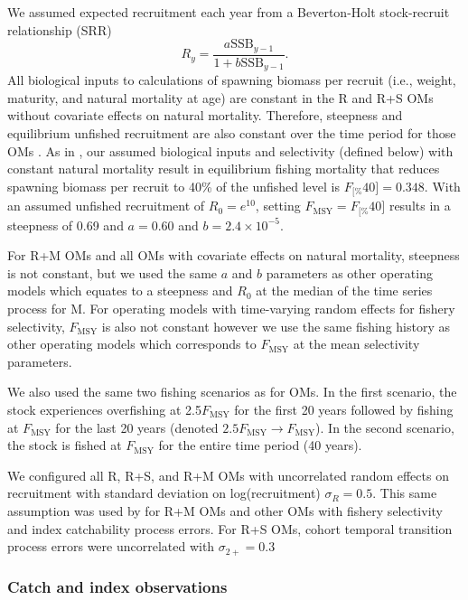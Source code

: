 \documentclass[
  12pt,
]{article}
\newcommand{\Fmsy}{\ensuremath{F_{\text{MSY}}}\xspace}
\newcommand{\Fspr}[1]{\ensuremath{F_{\text{{#1}\%}}}\xspace}
\begin{document}
We assumed expected recruitment each year from a Beverton-Holt stock-recruit relationship (SRR)
\[
R_{y} = \frac{a \text{SSB}_{y-1}}{1 + b \text{SSB}_{y-1}}.
\]
All biological inputs to calculations of spawning biomass per recruit (i.e., weight, maturity, and natural mortality at age) are constant in the R and R+S OMs without covariate effects on natural mortality. Therefore, steepness and equilibrium unfished recruitment are also constant over the time period for those OMs \citep{millerbrooks21}. As in \citet{milleretal_inreview1}, our assumed biological inputs and selectivity (defined below) with constant natural mortality result in equilibrium fishing mortality that reduces spawning biomass per recruit to 40\% of the unfished level is \(\Fspr[40] = 0.348\). With an assumed unfished recruitment of \(R_0 = e^{10}\), setting \(\Fmsy = \Fspr[40]\) results in a steepness of 0.69 and \(a=0.60\) and \(b = 2.4 \times 10^{-5}\).

For R+M OMs and all OMs with covariate effects on natural mortality, steepness is not constant, but we used the same \(a\) and \(b\) parameters as other operating models which equates to a steepness and \(R_0\) at the median of the time series process for M. For operating models with time-varying random effects for fishery selectivity, \Fmsy is also not constant however we use the same fishing history as other operating models which corresponds to \Fmsy at the mean selectivity parameters.

We also used the same two fishing scenarios as \citet{milleretal_inreview1} for OMs. In the first scenario, the stock experiences overfishing at 2.5\Fmsy for the first 20 years followed by fishing at \Fmsy for the last 20 years (denoted \(2.5\Fmsy \rightarrow \Fmsy\)). In the second scenario, the stock is fished at \Fmsy for the entire time period (40 years).

We configured all R, R+S, and R+M OMs with uncorrelated random effects on recruitment with standard deviation on log(recruitment) \(\sigma_R = 0.5\). This same assumption was used by \citet{milleretal_inreview1} for R+M OMs and other OMs with fishery selectivity and index catchability process errors. For R+S OMs, cohort temporal transition process errors were uncorrelated with \(\sigma_{2+} = 0.3\)

\hypertarget{catch-and-index-observations}{%
\subsubsection*{Catch and index observations}\label{catch-and-index-observations}}
\end{document}
